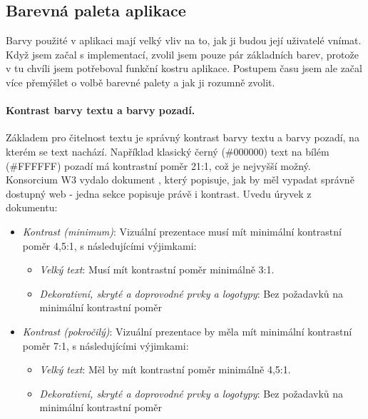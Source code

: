 
\subsection{Barevná paleta aplikace}\label{implementation:colors:idempotent}

Barvy použité v aplikaci mají velký vliv na to, jak ji budou její uživatelé vnímat. Když jsem začal s implementací, zvolil jsem pouze pár základních barev, protože v tu chvíli jsem potřeboval funkční kostru aplikace. Postupem času jsem ale začal více přemýšlet o volbě barevné palety a jak ji rozumně zvolit.

\paragraph{Kontrast barvy textu a barvy pozadí.} Základem pro čitelnost textu je správný kontrast barvy textu a barvy pozadí, na kterém se text nachází. Například klasický černý (\#000000) text na bílém (\#FFFFFF) pozadí má kontrastní poměr 21:1, což je nejvyšší možný. Konsorcium W3 vydalo dokument \cite{w3-access-guide}, který popisuje, jak by měl vypadat správně dostupný web - jedna sekce popisuje právě i kontrast. Uvedu úryvek z dokumentu:
\begin{itemize}
    \item \emph{Kontrast (minimum)}: Vizuální prezentace musí mít minimální kontrastní poměr 4,5:1, s následujícími výjimkami:
    \begin{itemize}
        \item \emph{Velký text}: Musí mít kontrastní poměr minimálně 3:1.
        \item \emph{Dekorativní, skryté a doprovodné prvky a logotypy}: Bez požadavků na minimální kontrastní poměr
    \end{itemize}
    \item \emph{Kontrast (pokročilý)}: Vizuální prezentace by měla mít minimální kontrastní poměr 7:1, s následujícími výjimkami:
    \begin{itemize}
        \item \emph{Velký text}: Měl by mít kontrastní poměr minimálně 4,5:1.
        \item \emph{Dekorativní, skryté a doprovodné prvky a logotypy}: Bez požadavků na minimální kontrastní poměr
    \end{itemize}
\end{itemize}

